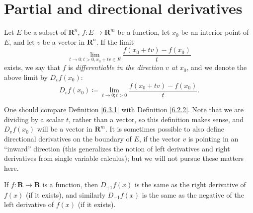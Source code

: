 \section{Partial and directional derivatives}\label{sec 6.3}

\begin{definition}\label{6.3.1}
    Let \(E\) be a subset of \(\mathbf{R}^n\), \(f : E \to \mathbf{R}^m\) be a function, let \(x_0\) be an interior point of \(E\), and let \(v\) be a vector in \(\mathbf{R}^n\).
    If the limit
    \[
        \lim_{t \to 0 ; t > 0, x_0 + tv \in E} \frac{f(x_0 + tv) - f(x_0)}{t}
    \]
    exists, we say that \(f\) is \emph{differentiable in the direction \(v\) at \(x_0\)}, and we denote the above limit by \(D_v f(x_0)\):
    \[
        D_v f(x_0) \coloneqq \lim_{t \to 0 ; t > 0} \frac{f(x_0 + tv) - f(x_0)}{t}.
    \]
\end{definition}

\begin{remark}\label{6.3.2}
    One should compare Definition \ref{6.3.1} with Definition \ref{6.2.2}.
    Note that we are dividing by a scalar \(t\), rather than a vector, so this definition makes sense, and \(D_v f(x_0)\) will be a vector in \(\mathbf{R}^m\).
    It is sometimes possible to also define directional derivatives on the boundary of \(E\), if the vector \(v\) is pointing in an ``inward'' direction
    (this generalizes the notion of left derivatives and right derivatives from single variable calculus);
    but we will not pursue these matters here.
\end{remark}

\begin{example}\label{6.3.3}
    If \(f : \mathbf{R} \to \mathbf{R}\) is a function, then \(D_{+1} f(x)\) is the same as the right derivative of \(f(x)\) (if it exists), and similarly \(D_{-1} f(x)\) is the same as the negative of the left derivative of \(f(x)\) (if it exists).
\end{example}

